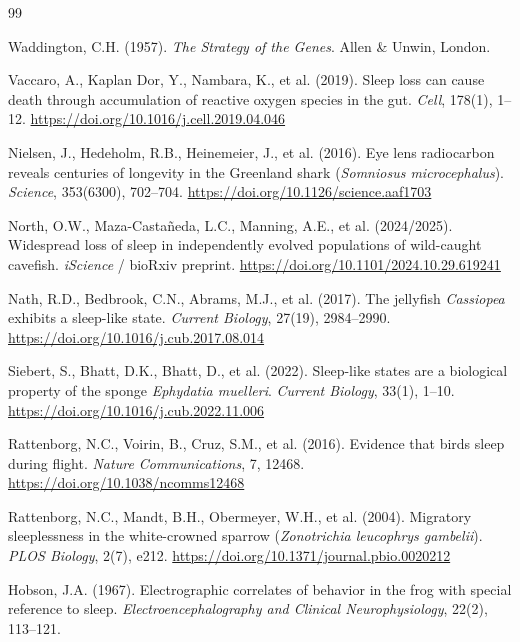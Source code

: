 \documentclass[12pt, a4paper]{article}
\begin{document}
\begin{thebibliography}{99}

Waddington, C.H. (1957).
\textit{The Strategy of the Genes}.
Allen \& Unwin, London.

Vaccaro, A., Kaplan Dor, Y., Nambara, K., et al. (2019).
Sleep loss can cause death through accumulation of reactive
oxygen species in the gut.
\textit{Cell}, 178(1), 1--12.
\url{https://doi.org/10.1016/j.cell.2019.04.046}

Nielsen, J., Hedeholm, R.B., Heinemeier, J., et al. (2016).
Eye lens radiocarbon reveals centuries of longevity in the
Greenland shark (\textit{Somniosus microcephalus}).
\textit{Science}, 353(6300), 702--704.
\url{https://doi.org/10.1126/science.aaf1703}

North, O.W., Maza-Casta\~{n}eda, L.C., Manning, A.E., et al.
(2024/2025).
Widespread loss of sleep in independently evolved populations
of wild-caught cavefish.
\textit{iScience} / bioRxiv preprint.
\url{https://doi.org/10.1101/2024.10.29.619241}

Nath, R.D., Bedbrook, C.N., Abrams, M.J., et al. (2017).
The jellyfish \textit{Cassiopea} exhibits a sleep-like state.
\textit{Current Biology}, 27(19), 2984--2990.
\url{https://doi.org/10.1016/j.cub.2017.08.014}

Siebert, S., Bhatt, D.K., Bhatt, D., et al. (2022).
Sleep-like states are a biological property of the sponge
\textit{Ephydatia muelleri}.
\textit{Current Biology}, 33(1), 1--10.
\url{https://doi.org/10.1016/j.cub.2022.11.006}

Rattenborg, N.C., Voirin, B., Cruz, S.M., et al. (2016).
Evidence that birds sleep during flight.
\textit{Nature Communications}, 7, 12468.
\url{https://doi.org/10.1038/ncomms12468}

Rattenborg, N.C., Mandt, B.H., Obermeyer, W.H., et al. (2004).
Migratory sleeplessness in the white-crowned sparrow
(\textit{Zonotrichia leucophrys gambelii}).
\textit{PLOS Biology}, 2(7), e212.
\url{https://doi.org/10.1371/journal.pbio.0020212}

Hobson, J.A. (1967).
Electrographic correlates of behavior in the frog with
special reference to sleep.
\textit{Electroencephalography and Clinical Neurophysiology},
22(2), 113--121.


\end{thebibliography}
\end{document}
